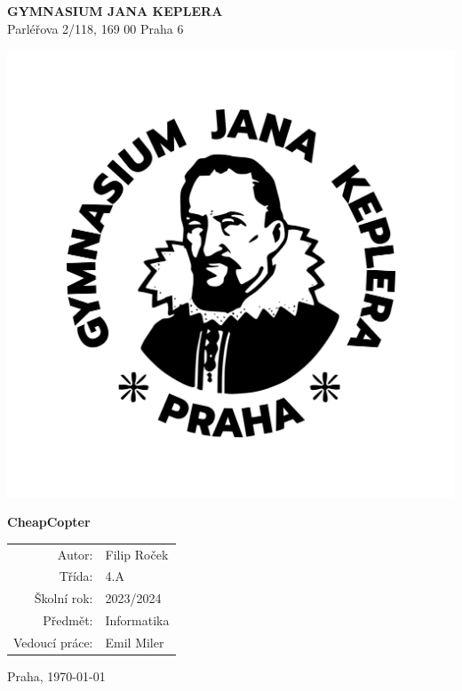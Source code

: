 \begin{titlepage}
    \begin{center}
    \vspace{5mm}
    \LARGE
    \textbf{GYMNASIUM JANA KEPLERA}\\
    \vspace{1mm}
    {\large Parléřova 2/118, 169 00 Praha 6}
    
    
    \includegraphics[width=.3\textwidth]{images/logo.png}
    
    
    \Huge\bfseries{CheapCopter}
    
    \vspace{12mm}
    \LARGE{}
    
    \large
    \begin{tabular}{rl}
    Autor: & Filip Roček \\
    \noalign{\vspace{2mm}}
    Třída: & 4.A \\
    \noalign{\vspace{2mm}}
    Školní rok: & 2023/2024 \\
    \noalign{\vspace{2mm}}
    Předmět: & Informatika \\
    \noalign{\vspace{2mm}}
    Vedoucí práce: & Emil Miler \\
    \end{tabular}
    
    \vspace{25mm}
    Praha, \today
    \end{center}
\end{titlepage}